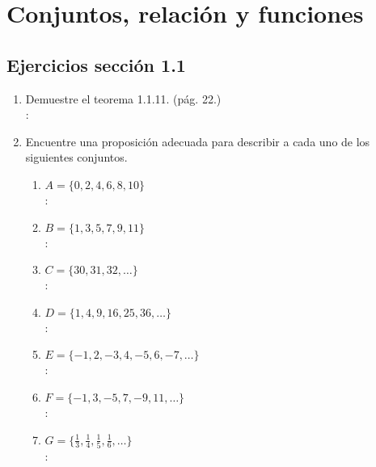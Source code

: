 \chapter{Conjuntos, relación y funciones}

\setcounter{section}{8}
\section{Ejercicios sección 1.1}

\begin{enumerate}[label=1.1.\arabic*.]
	\item Demuestre el teorema 1.1.11. (pág. 22.) \\
	\solucion: \\
	
	\item Encuentre una proposición adecuada para describir a cada uno de los siguientes conjuntos.
	\begin{enumerate}[label=(\arabic*)]
		\item $ A = \{ 0,2,4,6,8,10 \} $ \\
		\solucion: \\
		
		\item $ B = \{ 1,3,5,7,9,11 \} $ \\
		\solucion: \\
		
		\item $ C = \{ 30,31,32, \ldots \} $ \\
		\solucion: \\
		
		\item $ D = \{ 1,4,9,16,25,36,\ldots \} $ \\
		\solucion: \\
		
		\item $ E = \{ -1, 2, -3, 4, -5, 6, -7, \ldots \} $ \\
		\solucion: \\
		
		\item $ F = \{ -1, 3, -5, 7, -9, 11, \ldots \} $ \\
		\solucion: \\
		
		\item $ G = \{ \frac{1}{3}, \frac{1}{4}, \frac{1}{5}, \frac{1}{6}, \ldots \} $ \\
		\solucion: \\
		

\end{enumerate}
\end{enumerate}
